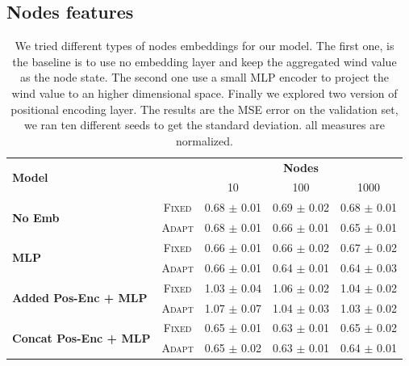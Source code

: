 \documentclass[a4paper,10pt]{article}
\begin{document}
\subsection{Nodes features}

\begin{table}
  \label{tab:nodes}
  \centering
  \begin{tabular}{lcccc} \toprule
    \multirow{2}{*}{\textbf{Model}}                &                            & \multicolumn{3}{c}{\textbf{Nodes}}                                                 \\ \cmidrule(lr){3-5}
                                                   &                            & 10                                 & 100                   & 1000                  \\ \hline
    \multirow{2}{*}{\textbf{No Emb}}               & \scriptsize \textsc{Fixed} & 0.68 \tiny $\pm$ 0.01              & 0.69 \tiny $\pm$ 0.02 & 0.68 \tiny $\pm$ 0.01 \\
                                                   & \scriptsize \textsc{Adapt} & 0.68 \tiny $\pm$ 0.01              & 0.66 \tiny $\pm$ 0.01 & 0.65 \tiny $\pm$ 0.01 \\
    \multirow{2}{*}{\textbf{MLP}}                  & \scriptsize \textsc{Fixed} & 0.66 \tiny $\pm$ 0.01              & 0.66 \tiny $\pm$ 0.02 & 0.67 \tiny $\pm$ 0.02 \\
                                                   & \scriptsize \textsc{Adapt} & 0.66 \tiny $\pm$ 0.01              & 0.64 \tiny $\pm$ 0.01 & 0.64 \tiny $\pm$ 0.03 \\
    \multirow{2}{*}{\textbf{Added Pos-Enc + MLP}}  & \scriptsize \textsc{Fixed} & 1.03 \tiny $\pm$ 0.04              & 1.06 \tiny $\pm$ 0.02 & 1.04 \tiny $\pm$ 0.02 \\
                                                   & \scriptsize \textsc{Adapt} & 1.07 \tiny $\pm$ 0.07              & 1.04 \tiny $\pm$ 0.03 & 1.03 \tiny $\pm$ 0.02 \\
    \multirow{2}{*}{\textbf{Concat Pos-Enc + MLP}} & \scriptsize \textsc{Fixed} & 0.65 \tiny $\pm$ 0.01              & 0.63 \tiny $\pm$ 0.01 & 0.65 \tiny $\pm$ 0.02 \\
                                                   & \scriptsize \textsc{Adapt} & 0.65 \tiny $\pm$ 0.02              & 0.63 \tiny $\pm$ 0.01 & 0.64 \tiny $\pm$ 0.01 \\

    \bottomrule
  \end{tabular}
  \caption{
    We tried different types of nodes embeddings for our model. The first one, is the baseline is to use no embedding layer and keep the aggregated wind value as the node state. The second one use a small MLP encoder to project the wind value to an higher dimensional space. Finally we explored two version of positional encoding layer. The results are the MSE error on the validation set, we ran ten different seeds to get the standard deviation. all measures are normalized.
  }
\end{table}
\end{document}
